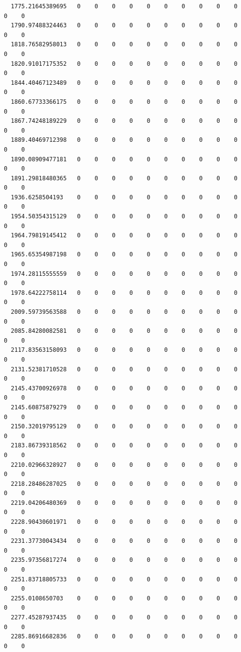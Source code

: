 \documentclass[
  letterpaper,
  DIV=11,
  numbers=noendperiod]{scrartcl}
\begin{document}
\begin{verbatim}
  1775.21645389695   0    0    0    0    0    0    0    0    0    0    0    0
  1790.97488324463   0    0    0    0    0    0    0    0    0    0    0    0
  1818.76582958013   0    0    0    0    0    0    0    0    0    0    0    0
  1820.91017175352   0    0    0    0    0    0    0    0    0    0    0    0
  1844.40467123489   0    0    0    0    0    0    0    0    0    0    0    0
  1860.67733366175   0    0    0    0    0    0    0    0    0    0    0    0
  1867.74248189229   0    0    0    0    0    0    0    0    0    0    0    0
  1889.40469712398   0    0    0    0    0    0    0    0    0    0    0    0
  1890.08909477181   0    0    0    0    0    0    0    0    0    0    0    0
  1891.29818480365   0    0    0    0    0    0    0    0    0    0    0    0
  1936.6258504193    0    0    0    0    0    0    0    0    0    0    0    0
  1954.50354315129   0    0    0    0    0    0    0    0    0    0    0    0
  1964.79819145412   0    0    0    0    0    0    0    0    0    0    0    0
  1965.65354987198   0    0    0    0    0    0    0    0    0    0    0    0
  1974.28115555559   0    0    0    0    0    0    0    0    0    0    0    0
  1978.64222758114   0    0    0    0    0    0    0    0    0    0    0    0
  2009.59739563588   0    0    0    0    0    0    0    0    0    0    0    0
  2085.84280082581   0    0    0    0    0    0    0    0    0    0    0    0
  2117.83563158093   0    0    0    0    0    0    0    0    0    0    0    0
  2131.52381710528   0    0    0    0    0    0    0    0    0    0    0    0
  2145.43700926978   0    0    0    0    0    0    0    0    0    0    0    0
  2145.60875879279   0    0    0    0    0    0    0    0    0    0    0    0
  2150.32019795129   0    0    0    0    0    0    0    0    0    0    0    0
  2183.86739318562   0    0    0    0    0    0    0    0    0    0    0    0
  2210.02966328927   0    0    0    0    0    0    0    0    0    0    0    0
  2218.28486287025   0    0    0    0    0    0    0    0    0    0    0    0
  2219.04206480369   0    0    0    0    0    0    0    0    0    0    0    0
  2228.90430601971   0    0    0    0    0    0    0    0    0    0    0    0
  2231.37730043434   0    0    0    0    0    0    0    0    0    0    0    0
  2235.97356817274   0    0    0    0    0    0    0    0    0    0    0    0
  2251.83718805733   0    0    0    0    0    0    0    0    0    0    0    0
  2255.0108650703    0    0    0    0    0    0    0    0    0    0    0    0
  2277.45287937435   0    0    0    0    0    0    0    0    0    0    0    0
  2285.86916682836   0    0    0    0    0    0    0    0    0    0    0    0

\end{verbatim}
\end{document}
